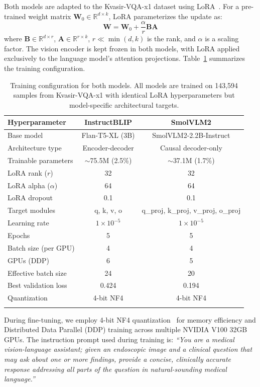 \documentclass[pdflatex,sn-mathphys-num]{sn-jnl}
\begin{document}
Both models are adapted to the Kvasir-VQA-x1 dataset using LoRA~\cite{hu2022lora}. For a pre-trained weight matrix $\mathbf{W}_0 \in \mathbb{R}^{d \times k}$, LoRA parameterizes the update as:
\begin{equation}
    \mathbf{W} = \mathbf{W}_0 + \frac{\alpha}{r} \mathbf{B}\mathbf{A}
\end{equation}
where $\mathbf{B} \in \mathbb{R}^{d \times r}$, $\mathbf{A} \in \mathbb{R}^{r \times k}$, $r \ll \min(d, k)$ is the rank, and $\alpha$ is a scaling factor. The vision encoder is kept frozen in both models, with LoRA applied exclusively to the language model's attention projections. Table~\ref{tab:training_config} summarizes the training configuration.

\begin{table}[t]
\caption{Training configuration for both models. All models are trained on 143,594 samples from Kvasir-VQA-x1 with identical LoRA hyperparameters but model-specific architectural targets.}\label{tab:training_config}
\begin{tabular*}{\textwidth}{@{\extracolsep\fill}lcc}
\toprule
\textbf{Hyperparameter} & \textbf{InstructBLIP} & \textbf{SmolVLM2} \\
\midrule
Base model & Flan-T5-XL (3B) & SmolVLM2-2.2B-Instruct \\
Architecture type & Encoder-decoder & Causal decoder-only \\
Trainable parameters & $\sim$75.5M (2.5\%) & $\sim$37.1M (1.7\%) \\
LoRA rank ($r$) & 32 & 32 \\
LoRA alpha ($\alpha$) & 64 & 64 \\
LoRA dropout & 0.1 & 0.1 \\
Target modules & q, k, v, o & q\_proj, k\_proj, v\_proj, o\_proj \\
Learning rate & $1 \times 10^{-5}$ & $1 \times 10^{-5}$ \\
Epochs & 5 & 5 \\
Batch size (per GPU) & 4 & 4 \\
GPUs (DDP) & 6 & 5 \\
Effective batch size & 24 & 20 \\
Best validation loss & 0.424 & 0.194 \\
Quantization & 4-bit NF4 & 4-bit NF4 \\
\botrule
\end{tabular*}
\end{table}

During fine-tuning, we employ 4-bit NF4 quantization~\cite{dettmers2024qlora} for memory efficiency and Distributed Data Parallel (DDP) training across multiple NVIDIA V100 32GB GPUs. The instruction prompt used during training is: \textit{``You are a medical vision-language assistant; given an endoscopic image and a clinical question that may ask about one or more findings, provide a concise, clinically accurate response addressing all parts of the question in natural-sounding medical language.''}
\end{document}
